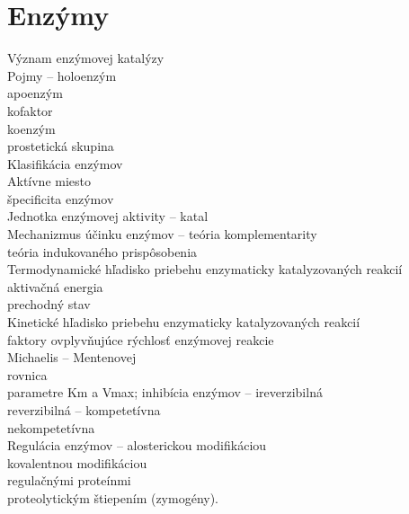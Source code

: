 \section{Enzýmy}
Význam enzýmovej katalýzy\\
Pojmy -- holoenzým\\
\tab apoenzým\\
\tab kofaktor\\
\tab koenzým\\
\tab prostetická skupina\\
Klasifikácia enzýmov\\
Aktívne miesto\\
\tab špecificita enzýmov\\
Jednotka enzýmovej aktivity -- katal\\
Mechanizmus účinku enzýmov -- teória komplementarity\\
\tab teória indukovaného prispôsobenia\\
Termodynamické hľadisko priebehu enzymaticky katalyzovaných reakcií\\
\tab aktivačná energia\\
\tab prechodný stav\\
Kinetické hľadisko priebehu enzymaticky katalyzovaných reakcií\\
\tab faktory ovplyvňujúce rýchlosť enzýmovej reakcie\\
\tab Michaelis -- Mentenovej\\
rovnica\\
\tab parametre Km a Vmax; inhibícia enzýmov -- ireverzibilná\\
\tab reverzibilná -- kompetetívna\\
\tab nekompetetívna\\
Regulácia enzýmov -- alosterickou modifikáciou\\
\tab kovalentnou modifikáciou\\
\tab regulačnými proteínmi\\
\tab proteolytickým štiepením (zymogény).\\
\\
